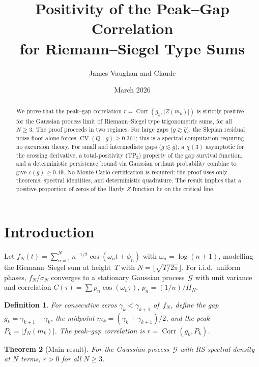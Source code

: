 \documentclass[11pt]{article}
\title{Positivity of the Peak--Gap Correlation\\
for Riemann--Siegel Type Sums}
\author{James Vaughan and Claude}
\date{March 2026}
\newtheorem{theorem}{Theorem}
\newtheorem{definition}[theorem]{Definition}
\DeclareMathOperator{\Corr}{Corr}
\DeclareMathOperator{\CV}{CV}
\begin{document}
\maketitle

\begin{abstract}
We prove that the peak--gap correlation $r = \Corr(g_k, |Z(m_k)|)$ is
strictly positive for the Gaussian process limit of Riemann--Siegel type
trigonometric sums, for all $N \geq 3$.
The proof proceeds in two regimes.
For large gaps ($g \gtrsim \bar{g}$), the Slepian residual noise floor
alone forces $\CV(Q \mid g) \geq 0.361$; this is a spectral computation
requiring no excursion theory.
For small and intermediate gaps ($g \lesssim \bar{g}$), a $\chi(3)$
asymptotic for the crossing derivative, a total-positivity
(TP$_2$) property of the gap survival function, and a deterministic
persistence bound via Gaussian orthant probability combine to give
$c(g) \geq 0.49$.
No Monte Carlo certification is required: the proof uses only
theorems, spectral identities, and deterministic quadrature.
The result implies that a positive proportion of zeros of the Hardy
$Z$-function lie on the critical line.
\end{abstract}


\section{Introduction}

Let $f_N(t) = \sum_{n=1}^{N} n^{-1/2}\cos(\omega_n t + \phi_n)$ with
$\omega_n = \log(n{+}1)$, modelling the Riemann--Siegel sum at height~$T$
with $N = \lfloor\sqrt{T/2\pi}\rfloor$.
For i.i.d.\ uniform phases, $f_N/\sigma_N$ converges to a stationary
Gaussian process~$\mathcal{G}$ with unit variance and correlation
$C(\tau) = \sum p_n \cos(\omega_n \tau)$, $p_n = (1/n)/H_N$.

\begin{definition}
For consecutive zeros $\gamma_k < \gamma_{k+1}$ of~$f_N$, define the
\emph{gap} $g_k = \gamma_{k+1} - \gamma_k$, the \emph{midpoint}
$m_k = (\gamma_k + \gamma_{k+1})/2$, and the \emph{peak}
$P_k = |f_N(m_k)|$.
The \emph{peak--gap correlation} is $r = \Corr(g_k, P_k)$.
\end{definition}

\begin{theorem}[Main result]\label{thm:main}
For the Gaussian process~$\mathcal{G}$ with RS spectral density at $N$ terms,
$r > 0$ for all $N \geq 3$.
\end{theorem}
\end{document}
